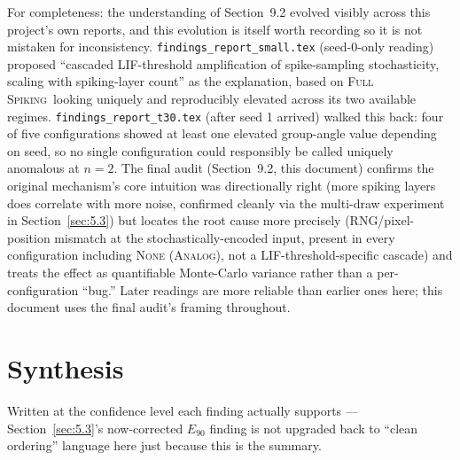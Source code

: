 \documentclass[11pt]{article}
\newcommand{\None}{\textsc{None (Analog)}}
\newcommand{\FullSpiking}{\textsc{Full Spiking}}
\begin{document}
For completeness: the understanding of Section~9.2 evolved visibly across this project's own reports,
and this evolution is itself worth recording so it is not mistaken for inconsistency.
\texttt{findings\_report\_small.tex} (seed-0-only reading) proposed ``cascaded LIF-threshold
amplification of spike-sampling stochasticity, scaling with spiking-layer count'' as the explanation,
based on \FullSpiking\ looking uniquely and reproducibly elevated across its two available regimes.
\texttt{findings\_report\_t30.tex} (after seed 1 arrived) walked this back: four of five configurations
showed at least one elevated group-angle value depending on seed, so no single configuration could
responsibly be called uniquely anomalous at $n{=}2$. The final audit (Section~9.2, this document)
confirms the original mechanism's core intuition was directionally right (more spiking layers does
correlate with more noise, confirmed cleanly via the multi-draw experiment in Section~\ref{sec:5.3}) but
locates the root cause more precisely (RNG/pixel-position mismatch at the stochastically-encoded input,
present in every configuration including \None, not a LIF-threshold-specific cascade) and treats the
effect as quantifiable Monte-Carlo variance rather than a per-configuration ``bug.'' Later readings are
more reliable than earlier ones here; this document uses the final audit's framing throughout.

\section{Synthesis}
\label{sec:part10}

Written at the confidence level each finding actually supports --- Section~\ref{sec:5.3}'s now-corrected
$E_{90}$ finding is not upgraded back to ``clean ordering'' language here just because this is the
summary.
\end{document}
